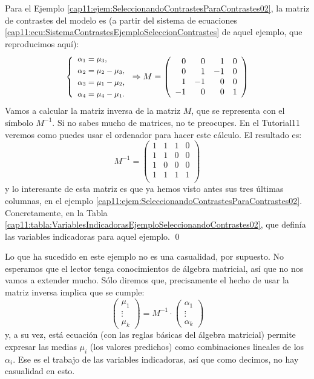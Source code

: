 \begin{ejemplo}
\label{cap11:ecu:MatizContrastesFrailecillos}
Para el Ejemplo \ref{cap11:ejem:SeleccionandoContrastesParaContrastes02}, la matriz de contrastes del modelo es (a partir del sistema de ecuaciones \ref{cap11:ecu:SistemaContrastesEjemploSeleccionContrastes} de aquel ejemplo, que reproducimos aquí):
\[
{\small
\left\{
\begin{array}{l}
\alpha_1=\mu_3,\\[1mm]
\alpha_2=\mu_2-\mu_3,\\[1mm]
\alpha_3=\mu_1-\mu_2,\\[1mm]
\alpha_4=\mu_4-\mu_1.
\end{array}\right.}
\Rightarrow
M=\left(
\begin{array}{rrrr}
0&0&1&0\\
0&1&-1&0\\
1&-1&0&0\\
-1&0&0&1
\end{array}
\right)
\]
Vamos a calcular la {\sf matriz inversa} de la matriz $M$, que se representa con el símbolo $M^{-1}$. Si no sabes mucho de matrices, no te preocupes. En el Tutorial11 veremos como puedes usar el ordenador para hacer este cálculo. El resultado es:
\[
M^{-1}=
\left(
\begin{array}{rrrr}
1 & 1 & 1 & 0 \\
1 & 1 & 0 & 0 \\
1 & 0 & 0 & 0 \\
1 & 1 & 1 & 1 \\
\end{array}
\right)
\]
y lo interesante de esta matriz es que ya hemos visto antes sus tres últimas columnas,  en el ejemplo \ref{cap11:ejem:SeleccionandoContrastesParaContrastes02}. Concretamente, en la Tabla \ref{cap11:tabla:VariablesIndicadorasEjemploSeleccionandoContrastes02}, que definía las variables indicadoras para aquel ejemplo.
\qed
\end{ejemplo}
Lo que ha sucedido en este ejemplo no es una casualidad, por supuesto. No esperamos que el lector tenga conocimientos de álgebra matricial, así que no nos vamos a extender mucho. Sólo diremos que, precisamente el hecho de usar la matriz inversa implica que se cumple:
\[
\left(
\begin{array}{c}
\mu_1\\\vdots\\\mu_k
\end{array}
\right)=
M^{-1}
\cdot
\left(
\begin{array}{c}
\alpha_1\\\vdots\\\alpha_k
\end{array}
\right)
\]
y, a su vez, está ecuación (con las reglas básicas del álgebra matricial) permite expresar las medias $\mu_i$ (los valores predichos) como combinaciones lineales de los $\alpha_i$. Ese es el trabajo de las variables indicadoras, así que como decimos, no hay casualidad en esto.

